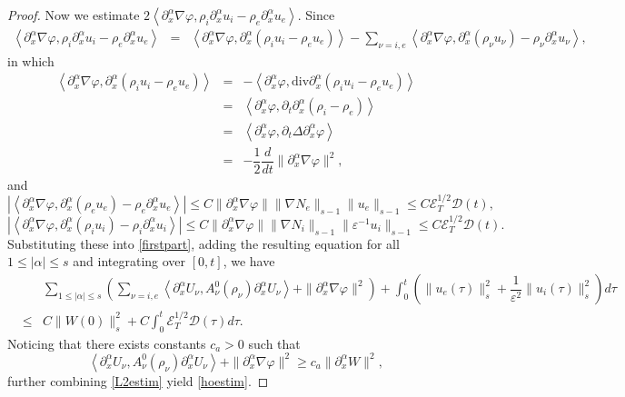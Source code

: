 \documentclass[reqno,twoside,12pt,a4paper]{amsart}
\newcommand{\eps}{\mathbb{\varepsilon}}
\newcommand{\al}{\alpha}
\newcommand{\dive}{\mathrm{div}}
\newcommand{\pt}{\partial_t}
\newcommand{\pa}{\partial}
\newcommand{\D}{\nabla}
\newcommand{\vp}{\varphi}
\newcommand{\cubic}{C\mathscr{E}_T^{1/2}\mathscr{D}(t)}
\numberwithin{equation}{section}
\begin{document}
\begin{proof}
Now we estimate $2\left<\pa_x^\al \D\vp, \rho_i\pa_x^\al u_i-\rho_e \pa_x^\al u_e\right>$. Since
\begin{eqnarray}
\left<\pa_x^\al \D\vp, \rho_i\pa_x^\al u_i-\rho_e \pa_x^\al u_e\right>&=&\left<\pa_x^\al\D\vp, \pa_x^\al(\rho_iu_i-\rho_eu_e)\right>-\sum_{\nu=i,e}\left<\pa_x^\al \D\vp, \pa_x^\al(\rho_\nu u_\nu)-\rho_\nu\pa_x^\al u_\nu\right>,\nonumber
\end{eqnarray}
in which 
\begin{eqnarray}
\left<\pa_x^\al\D\vp, \pa_x^\al(\rho_iu_i-\rho_eu_e)\right>&=&-\left<\pa_x^\al\vp, \dive\pa_x^\al(\rho_i u_i-\rho_eu_e)\right>\nonumber\\
&=&\left<\pa_x^\al\vp, \pt\pa_x^\al(\rho_i-\rho_e)\right>\nonumber\\
&=&\left<\pa_x^\al\vp, \pt\Delta\pa_x^\al\vp\right>\nonumber\\
&=&-\dfrac{1}{2}\dfrac{d}{dt}\|\pa_x^\al\D\vp\|^2,\nonumber
\end{eqnarray}
and
\[
\left|\left<\pa_x^\al \D\vp, \pa_x^\al(\rho_e u_e)-\rho_e\pa_x^\al u_e\right>\right|\leq C\|\pa_x^\al\D\vp\|\|\D N_e\|_{s-1}\|u_e\|_{s-1}\leq \cubic,
\]
\[
\left|\left<\pa_x^\al \D\vp, \pa_x^\al(\rho_i u_i)-\rho_i\pa_x^\al u_i\right>\right|\leq C\|\pa_x^\al\D\vp\|\|\D N_i\|_{s-1}\|\eps^{-1} u_i\|_{s-1}\leq \cubic.
\]
Substituting these into \eqref{firstpart}, adding the resulting equation for all $1\leq |\al|\leq s$ and integrating over $[0,t]$, we have
\begin{eqnarray*}
&&\sum_{1\leq|\al|\leq s}\left( \sum_{\nu=i,e} \left<\pa_x^\al U_\nu, A_\nu^0(\rho_\nu)\pa_x^\al U_\nu\right>+ \|\pa_x^\al\D\vp\|^2\right)+\int_0^t\left(\|u_e(\tau)\|_s^2+\dfrac{1}{\eps^{2}} \|u_i(\tau)\|_s^2\right)d\tau\nonumber\\
&\leq& C\|W(0)\|_s^2+C\int_0^t\mathscr{E}_T^{1/2}\mathscr{D}(\tau)d\tau.
\end{eqnarray*}
Noticing that there exists constants $c_a>0$ such that
\[
\left<\pa_x^\al U_\nu, A_\nu^0(\rho_\nu)\pa_x^\al U_\nu\right>+ \|\pa_x^\al\D\vp\|^2\geq c_a\|\pa_x^\al W\|^2,
\]
further combining \eqref{L2estim} yield \eqref{hoestim}. 
\end{proof}
\end{document}
